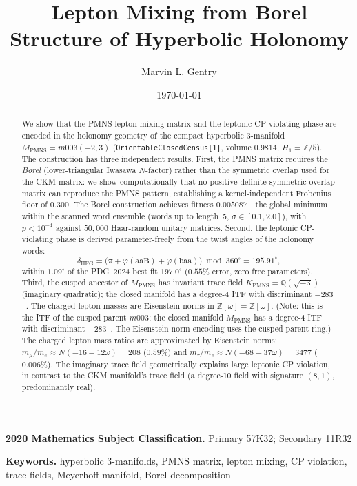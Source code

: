 \documentclass[11pt,a4paper]{article}
\theoremstyle{definition}
\newcommand{\MPMNS}{M_{\mathrm{PMNS}}}
\newcommand{\KPMNS}{K_{\mathrm{PMNS}}}
\newcommand{\Zom}{\mathbb{Z}[\omega]}
\newcommand{\Zfive}{\mathbb{Z}/5}
\newcommand{\subjclass}[2][2020]{\par\noindent\textbf{#1 Mathematics Subject Classification.} #2\par}
\newcommand{\keywords}[1]{\par\noindent\textbf{Keywords.} #1\par}
\begin{document}
\title{Lepton Mixing from Borel Structure of Hyperbolic Holonomy}

\author[1]{Marvin L. Gentry}
\date{\today}

\begin{abstract}
We show that the PMNS lepton mixing matrix and the leptonic
CP-violating phase are encoded in the holonomy geometry of the compact
hyperbolic 3-manifold $\MPMNS = m003(-2,3)$
(\texttt{OrientableClosedCensus[1]}, volume $0.9814$,
$H_1=\Zfive$).
The construction has three independent results.
First, the PMNS matrix requires the \emph{Borel} (lower-triangular
Iwasawa $N$-factor) rather than the symmetric overlap used for the CKM
matrix: we show computationally that no positive-definite symmetric
overlap matrix can reproduce the PMNS pattern, establishing a
kernel-independent Frobenius floor of $0.300$.
The Borel construction achieves fitness $0.005087$---the global
minimum within the scanned word ensemble (words up to length~5,
$\sigma\in[0.1,2.0]$), with $p<10^{-4}$ against
$50{,}000$ Haar-random unitary matrices.
Second, the leptonic CP-violating phase is derived parameter-freely
from the twist angles of the holonomy words:
\[
  \delta_{\mathrm{HFG}}
  = \bigl(\pi + \varphi(\mathrm{aaB}) + \varphi(\mathrm{baa})\bigr)
    \bmod 360^\circ
  = 195.91^\circ,
\]
within $1.09^\circ$ of the PDG~2024 best fit $197.0^\circ$
($0.55\%$ error, zero free parameters).
Third, the cusped ancestor of $\MPMNS$ has invariant trace field
$\KPMNS = \mathbb{Q}(\sqrt{-3})$ (imaginary quadratic);
the closed manifold has a degree-4 ITF with discriminant $-283$~\cite{Chinburg98}.
The charged lepton masses are Eisenstein norms in $\Zom = \mathbb{Z}[\omega]$.
(Note: this is the ITF of the cusped parent $m003$;
the closed manifold $\MPMNS$ has a degree-4 ITF with
discriminant $-283$~\cite{Chinburg98}.
The Eisenstein norm encoding uses the cusped parent ring.)
The charged lepton mass ratios are approximated by Eisenstein norms:
$m_\mu/m_e\approx N(-16-12\omega)=208$ ($0.59\%$) and
$m_\tau/m_e\approx N(-68-37\omega)=3477$ ($0.006\%$).
The imaginary trace field geometrically explains large leptonic
CP violation, in contrast to the CKM manifold's trace field
(a degree-10 field with signature $(8,1)$, predominantly real).
\end{abstract}

\subjclass[2020]{Primary 57K32; Secondary 11R32}

\keywords{hyperbolic 3-manifolds, PMNS matrix, lepton mixing, CP violation,
trace fields, Meyerhoff manifold, Borel decomposition}
\end{document}
